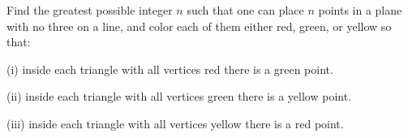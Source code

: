 Find the greatest possible integer $n$ such that one can place $n$ points in a plane with no three on a line, and color each of them either red, green, or yellow so that:

(i) inside each triangle with all vertices red there is a green point.

(ii) inside each triangle with all vertices green there is a yellow point.

(iii) inside each triangle with all vertices yellow there is a red point.